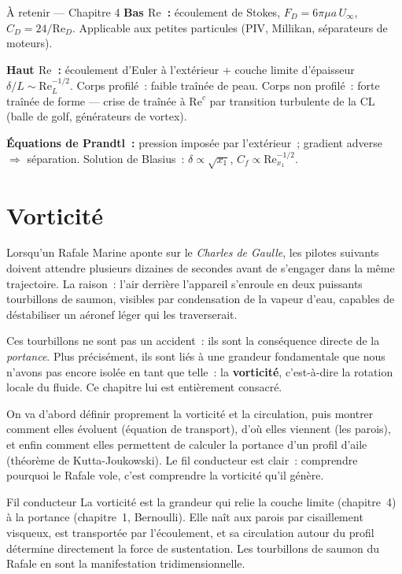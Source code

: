 \documentclass[11pt,a4paper]{report}
\begin{document}
\begin{importantbox}{\`A retenir --- Chapitre 4}
\textbf{Bas $\mathrm{Re}$~:} \'ecoulement de Stokes, $F_D = 6\pi\mu a\,U_\infty$,
$C_D = 24/\mathrm{Re}_D$. Applicable aux petites particules (PIV, Millikan, s\'eparateurs
de moteurs).

\textbf{Haut $\mathrm{Re}$~:} \'ecoulement d'Euler \`a l'ext\'erieur + couche limite
d'\'epaisseur $\delta/L \sim \mathrm{Re}_L^{-1/2}$. Corps profil\'e~: faible tra\^in\'ee
de peau. Corps non profil\'e~: forte tra\^in\'ee de forme --- crise de tra\^in\'ee \`a
$\mathrm{Re}^c$ par transition turbulente de la CL (balle de golf, g\'en\'erateurs de
vortex).

\textbf{\'Equations de Prandtl~:} pression impos\'ee par l'ext\'erieur~;
gradient adverse $\Rightarrow$ s\'eparation. Solution de Blasius~: $\delta \propto
\sqrt{x_1}$, $C_f \propto \mathrm{Re}_{x_1}^{-1/2}$.
\end{importantbox}

\chapter{Vorticit\'e}

Lorsqu'un Rafale Marine aponte sur le \emph{Charles de Gaulle}, les pilotes suivants
doivent attendre plusieurs dizaines de secondes avant de s'engager dans la m\^eme
trajectoire. La raison~: l'air derri\`ere l'appareil s'enroule en deux puissants
tourbillons de saumon, visibles par condensation de la vapeur d'eau, capables de
d\'estabiliser un a\'eronef l\'eger qui les traverserait.

Ces tourbillons ne sont pas un accident~: ils sont la cons\'equence directe de la
\emph{portance}. Plus pr\'ecis\'ement, ils sont li\'es \`a une grandeur fondamentale
que nous n'avons pas encore isol\'ee en tant que telle~: la \textbf{vorticit\'e},
c'est-\`a-dire la rotation locale du fluide. Ce chapitre lui est enti\`erement consacr\'e.

On va d'abord d\'efinir proprement la vorticit\'e et la circulation, puis montrer
comment elles \'evoluent (\'equation de transport), d'o\`u elles viennent (les parois),
et enfin comment elles permettent de calculer la portance d'un profil d'aile
(th\'eor\`eme de Kutta-Joukowski). Le fil conducteur est clair~: comprendre pourquoi
le Rafale vole, c'est comprendre la vorticit\'e qu'il g\'en\`ere.

\begin{defbox}{Fil conducteur}
La vorticit\'e est la grandeur qui relie la couche limite (chapitre~4) \`a la portance
(chapitre~1, Bernoulli). Elle na\^it aux parois par cisaillement visqueux, est transport\'ee
par l'\'ecoulement, et sa circulation autour du profil d\'etermine directement la force de
sustentation. Les tourbillons de saumon du Rafale en sont la manifestation tridimensionnelle.
\end{defbox}
\end{document}
